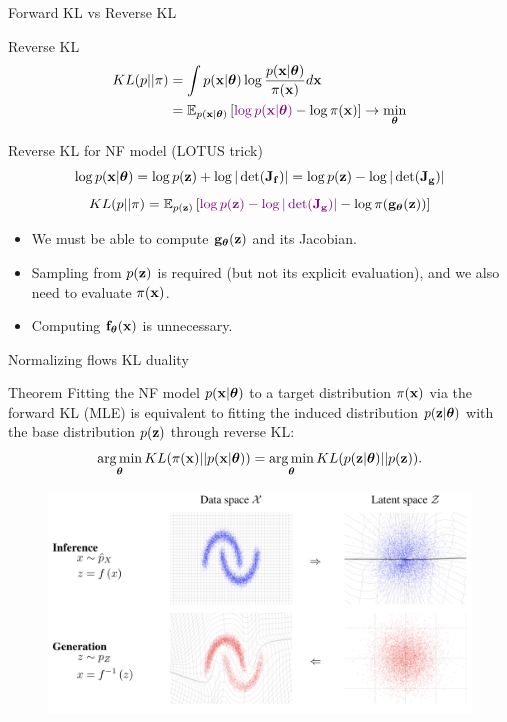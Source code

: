 \documentclass{beamer}
\begin{document}
\begin{frame}{Forward KL vs Reverse KL}
	\begin{block}{Reverse KL}
	  	\vspace{-0.5cm}
			\begin{align*}
				KL(p || \pi) &= \int p(\mathbf{x} | \boldsymbol{\theta}) \log \frac{p(\mathbf{x} | \boldsymbol{\theta})}{\pi(\mathbf{x})} d \mathbf{x} \\
				&= \mathbb{E}_{p(\mathbf{x} | \boldsymbol{\theta})} \left[{\color{violet}\log p(\mathbf{x} | \boldsymbol{\theta})} - \log \pi(\mathbf{x})\right] \rightarrow \min_{\boldsymbol{\theta}}
			\end{align*}
		\vspace{-0.7cm}
	\end{block}
	\begin{block}{Reverse KL for NF model (LOTUS trick)}
  		\vspace{-0.3cm}
		\[
			 \log p(\mathbf{x} | \boldsymbol{\theta}) = \log p(\mathbf{z}) +  \log  |\det (\mathbf{J}_{\mathbf{f}})| = \log p(\mathbf{z}) - \log |\det (\mathbf{J}_{\mathbf{g}})| 
		\]
		\[
			KL(p || \pi)  = \mathbb{E}_{p(\mathbf{z})} \left[ {\color{violet} \log p(\mathbf{z}) -  \log |\det (\mathbf{J}_{\mathbf{g}})| } - \log \pi(\mathbf{g}_{\boldsymbol{\theta}}(\mathbf{z})) \right]
		\]
		\vspace{-0.3cm}
		\begin{itemize}
		\item We must be able to compute $\mathbf{g}_{\boldsymbol{\theta}}(\mathbf{z})$ and its Jacobian.
		\item Sampling from $p(\mathbf{z})$ is required (but not its explicit evaluation), and we also need to evaluate $\pi(\mathbf{x})$.
		\item Computing $\mathbf{f}_{\boldsymbol{\theta}}(\mathbf{x})$ is unnecessary.
		\end{itemize}
	\end{block}
\end{frame}
\begin{frame}{Normalizing flows KL duality}
	\begin{block}{Theorem}
		Fitting the NF model $p(\mathbf{x}| \boldsymbol{\theta})$ to a target distribution $\pi(\mathbf{x})$ via the forward KL (MLE) is equivalent to fitting the induced distribution $p(\mathbf{z}| \boldsymbol{\theta})$ with the base distribution $p(\mathbf{z})$ through reverse KL:
		\vspace{-0.2cm}
		\[
			\operatorname*{arg\,min}_{\boldsymbol{\theta}} KL(\pi(\mathbf{x}) || p(\mathbf{x} | \boldsymbol{\theta})) = \operatorname*{arg\,min}_{\boldsymbol{\theta}} KL(p(\mathbf{z} | \boldsymbol{\theta}) || p(\mathbf{z})).
		\]
		\vspace{-0.7cm}
	\end{block}
	\begin{figure}
		\includegraphics[width=0.85\linewidth]{figs/flows_how2}
	\end{figure}
\end{frame}
\end{document}
